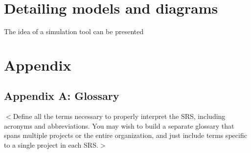 \documentclass{report}
\begin{document}



\chapter{Detailing models and diagrams}
The idea of a simulation tool can be presented 


\chapter{Appendix}
\section{Appendix A: Glossary}
$<$Define all the terms necessary to properly interpret the SRS, including 
acronyms and abbreviations. You may wish to build a separate glossary that spans 
multiple projects or the entire organization, and just include terms specific to 
a single project in each SRS.$>$
\end{document}
